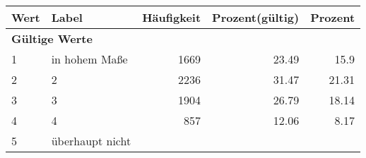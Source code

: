      \begin{longtable}{lXrrr}
     \toprule
     \textbf{Wert} & \textbf{Label} & \textbf{Häufigkeit} & \textbf{Prozent(gültig)} & \textbf{Prozent} \\
     \endhead
     \midrule
     \multicolumn{5}{l}{\textbf{Gültige Werte}}\\

     1 &
     \multicolumn{1}{X}{ in hohem Maße   } &


       \num{1669} &
       \num[round-mode=places,round-precision=2]{23.49} &
         \num[round-mode=places,round-precision=2]{15.9} \\

     2 &
     \multicolumn{1}{X}{ 2   } &


       \num{2236} &
       \num[round-mode=places,round-precision=2]{31.47} &
         \num[round-mode=places,round-precision=2]{21.31} \\

     3 &
     \multicolumn{1}{X}{ 3   } &


       \num{1904} &
       \num[round-mode=places,round-precision=2]{26.79} &
         \num[round-mode=places,round-precision=2]{18.14} \\

     4 &
     \multicolumn{1}{X}{ 4   } &


       \num{857} &
       \num[round-mode=places,round-precision=2]{12.06} &
         \num[round-mode=places,round-precision=2]{8.17} \\

     5 &
     \multicolumn{1}{X}{ überhaupt nicht   } &



\end{longtable}
